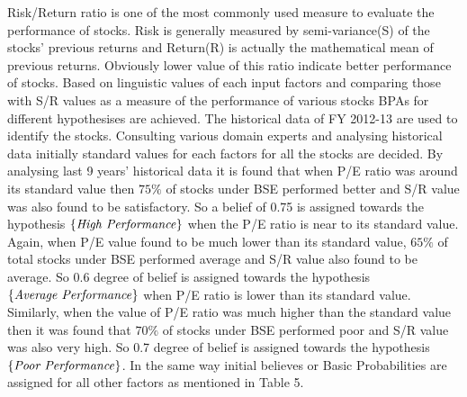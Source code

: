 \documentclass{ws-ijufks}
\begin{document}
Risk/Return ratio is one of the most commonly used measure to evaluate the performance of stocks. Risk is generally 
measured by semi-variance(S) of the stocks' previous returns and Return(R) is actually the mathematical mean of 
previous returns. Obviously lower value of this ratio indicate better performance of stocks. Based on linguistic values 
of each input factors and comparing those with S/R values as a measure of the performance of various stocks BPAs for 
different hypothesises are achieved. The historical data of FY 2012-13 are used to identify the stocks. Consulting 
various domain experts and analysing historical data initially standard values for each factors for all the stocks are 
decided. By analysing last 9 years' historical data it is found that when P/E ratio was around its standard value then 
$75\%$ of stocks under BSE performed better and S/R value was also found to be satisfactory. So a belief of 0.75 is 
assigned towards the hypothesis $\{\text{\emph{High Performance}}\}$ when the P/E ratio is near to its standard value. 
Again, when P/E value found to be much lower than its standard value, $65\%$ of total stocks under BSE performed 
average and S/R value also found to be average. So 0.6 degree of belief is assigned towards the hypothesis 
$\{\text{\emph{Average Performance}}\}$ when P/E ratio is lower than its standard value. Similarly, when the value of 
P/E ratio was much higher than the standard value then it was found that $70\%$ of stocks under BSE performed poor and 
S/R value was also very high. So 0.7 degree of belief is assigned towards the hypothesis $\{\text{\emph{Poor 
Performance}}\}$. In the same way initial believes or Basic Probabilities are assigned for all other factors as 
mentioned in Table 5.
\end{document}
